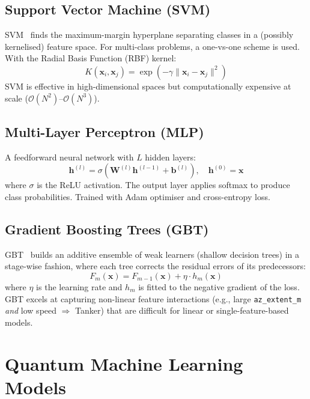 \documentclass[12pt, a4paper]{article}
\newcommand{\vect}[1]{\boldsymbol{#1}}
\newcommand{\mat}[1]{\mathbf{#1}}
\begin{document}
\subsection{Support Vector Machine (SVM)}

SVM~\cite{cortes1995support} finds the maximum-margin hyperplane separating
classes in a (possibly kernelised) feature space. For multi-class problems,
a one-vs-one scheme is used. With the Radial Basis Function (RBF) kernel:
\begin{equation}
    K(\vect{x}_i, \vect{x}_j) = \exp\!\left(-\gamma \|\vect{x}_i - \vect{x}_j\|^2\right)
\end{equation}
SVM is effective in high-dimensional spaces but computationally expensive
at scale ($\mathcal{O}(N^2)$--$\mathcal{O}(N^3)$).

\subsection{Multi-Layer Perceptron (MLP)}

A feedforward neural network with $L$ hidden layers:
\begin{equation}
    \vect{h}^{(l)} = \sigma\!\left(\mat{W}^{(l)} \vect{h}^{(l-1)} + \vect{b}^{(l)}\right),
    \quad \vect{h}^{(0)} = \vect{x}
\end{equation}
where $\sigma$ is the ReLU activation. The output layer applies softmax to
produce class probabilities. Trained with Adam optimiser and cross-entropy loss.

\subsection{Gradient Boosting Trees (GBT)}

GBT~\cite{friedman2001greedy} builds an additive ensemble of weak learners
(shallow decision trees) in a stage-wise fashion, where each tree corrects
the residual errors of its predecessors:
\begin{equation}
    F_m(\vect{x}) = F_{m-1}(\vect{x}) + \eta \cdot h_m(\vect{x})
\end{equation}
where $\eta$ is the learning rate and $h_m$ is fitted to the negative gradient
of the loss. GBT excels at capturing non-linear feature interactions
(e.g., large \texttt{az\_extent\_m} \emph{and} low speed $\Rightarrow$ Tanker)
that are difficult for linear or single-feature-based models.

\section{Quantum Machine Learning Models}
\label{sec:qml}
\end{document}
